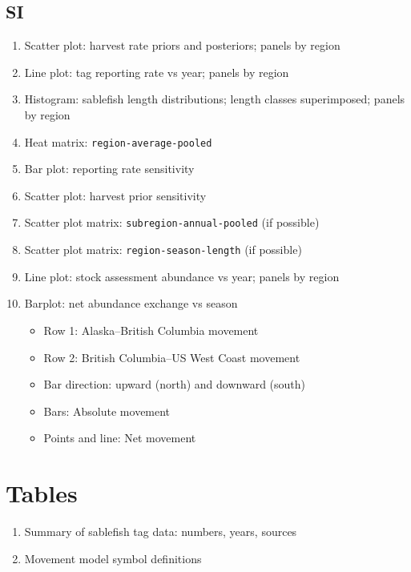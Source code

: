 \documentclass{article}
\begin{document}
\subsection{SI}
\begin{enumerate}
    \item Scatter plot: harvest rate priors and posteriors; panels by region
    \item Line plot: tag reporting rate vs year; panels by region
    \item Histogram: sablefish length distributions; length classes superimposed; panels by region
    \item Heat matrix: \texttt{region-average-pooled}
    \item Bar plot: reporting rate sensitivity
    \item Scatter plot: harvest prior sensitivity
    \item Scatter plot matrix: \texttt{subregion-annual-pooled} (if possible)
    \item Scatter plot matrix: \texttt{region-season-length} (if possible)
    \item Line plot: stock assessment abundance vs year; panels by region
    \item Barplot: net abundance exchange vs season
    \begin{itemize}
        \item Row 1: Alaska--British Columbia movement
        \item Row 2: British Columbia--US West Coast movement
        \item Bar direction: upward (north) and downward (south)
        \item Bars: Absolute movement
        \item Points and line: Net movement
    \end{itemize}

\end{enumerate}

\section{Tables}
\begin{enumerate}
    \item Summary of sablefish tag data: numbers, years, sources
    \item Movement model symbol definitions
\end{enumerate}
\end{document}
